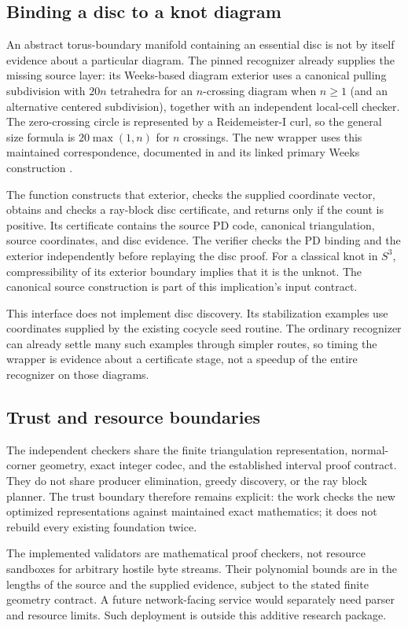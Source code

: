 \subsection{Binding a disc to a knot diagram}

An abstract torus-boundary manifold containing an essential disc is not by
itself evidence about a particular diagram.  The pinned recognizer already
supplies the missing source layer: its Weeks-based diagram exterior uses a
canonical pulling subdivision with $20n$ tetrahedra for an $n$-crossing diagram
when $n\ge1$ (and an alternative centered subdivision), together with an independent local-cell
checker.  The zero-crossing circle is represented by a Reidemeister-I curl,
so the general size formula is $20\max(1,n)$ for $n$ crossings.
The new wrapper uses this maintained correspondence, documented in
 and its linked primary Weeks construction
\cite{ProveIt}.

The function  constructs that exterior,
checks the supplied coordinate vector, obtains and checks a ray-block disc
certificate, and returns  only if the count is positive.  Its
certificate contains the source PD code, canonical triangulation, source
coordinates, and disc evidence.  The verifier checks the PD binding and the
exterior independently before replaying the disc proof.  For a classical
knot in $S^3$, compressibility of its exterior boundary implies that it is
the unknot.  The canonical source construction is part of this implication's
input contract.

This interface does not implement disc discovery.  Its stabilization examples
use coordinates supplied by the existing cocycle seed routine.  The ordinary
recognizer can already settle many such examples through simpler routes, so
timing the wrapper is evidence about a certificate stage, not a speedup of the
entire recognizer on those diagrams.

\subsection{Trust and resource boundaries}

The independent checkers share the finite triangulation representation,
normal-corner geometry, exact integer codec, and the established interval
proof contract.  They do not share producer elimination, greedy discovery,
or the ray block planner.  The trust boundary therefore remains explicit:
the work checks the new optimized representations against maintained exact
mathematics; it does not rebuild every existing foundation twice.

The implemented validators are mathematical proof checkers, not resource
sandboxes for arbitrary hostile byte streams.  Their polynomial bounds are
in the lengths of the source and the supplied evidence, subject to the stated
finite geometry contract.  A future network-facing service would separately
need parser and resource limits.  Such deployment is outside this additive
research package.
